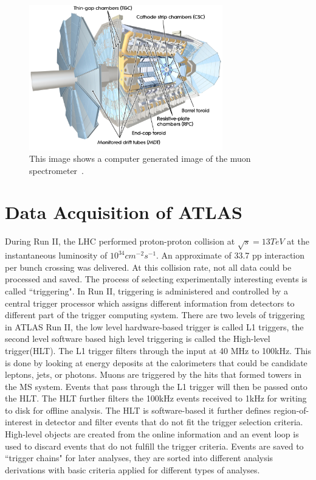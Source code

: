 \begin{figure}[!htb]
    \begin{center}
        \includegraphics[width=0.75\textwidth]{figures/chapter_ATLAS/MuonSpectrometer}
        \caption{
            This image shows a computer generated image of the muon spectrometer~\cite{Pequenao:1095929}.
        }
        \label{fig:MuonSpectrometer}
    \end{center}
\end{figure}

\section{Data Acquisition of ATLAS}
\label{trigger}
During Run II, the LHC performed proton-proton collision at $\sqrt{s}=13 TeV$ at the instantaneous luminosity of $10^{34}cm^{-2}s^{-1}$. An approximate of 33.7 pp interaction per bunch crossing was delivered. 
At this collision rate, not all data could be processed and saved. The process of selecting experimentally interesting events is called ``triggering". In Run II, triggering is administered and controlled by a central trigger processor which assigns different information from detectors to different part of the trigger computing system. There are two levels of triggering in ATLAS Run II, the low level hardware-based trigger is called L1 triggers, the second level software based high level triggering is called the High-level trigger(HLT). 
The L1 trigger filters through the input at 40 MHz to 100kHz. This is done by looking at energy deposits at the calorimeters that could be
candidate leptons, jets, or photons. Muons are triggered by the hits that formed towers in the MS system. 
Events that pass through the L1 trigger will then be passed onto the HLT. The HLT further filters the 100kHz events received to 1kHz for writing to disk for offline analysis. The HLT is software-based it further defines region-of-interest in detector and filter events that do not fit the trigger selection criteria. High-level objects are created from
the online information and an event loop is used to discard events that do not fulfill the trigger criteria.
Events are saved to ``trigger chains" for later analyses, they are sorted into different analysis derivations with basic criteria applied for different types of analyses. 

